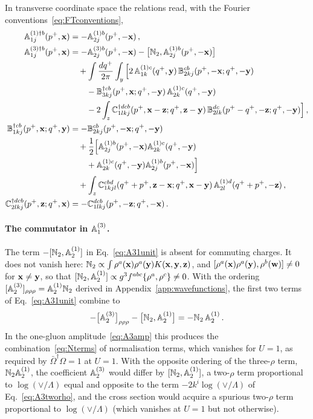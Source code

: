 In transverse coordinate space the relations read, with the Fourier conventions~\eqref{eq:FTconventions},
\begin{align}
\mathbb{A}^{(1)\dagger b}_{1j}(p^+,\mathbf{x})&=-\mathbb{A}^{(1)b}_{2j}(p^+,-\mathbf{x})\,,\notag\\
\mathbb{A}^{(3)\dagger b}_{1j}(p^+,\mathbf{x})&=-\mathbb{A}^{(3)b}_{2j}(p^+,-\mathbf{x})-\big[\mathbb{N}_2,\mathbb{A}^{(1)b}_{2j}(p^+,-\mathbf{x})\big]
\notag\\&\quad+\int\frac{dq^+}{2\pi}\int_y\Big[2\,\mathbb{A}^{(1)c}_{1k}(q^+,\mathbf{y})\,\mathbb{B}^{cb}_{2kj}(p^+,-\mathbf{x};q^+,-\mathbf{y})
\notag\\&\qquad
-\mathbb{B}^{\dagger cb}_{3kj}(p^+,\mathbf{x};q^+,-\mathbf{y})\,\mathbb{A}^{(1)c}_{2k}(q^+,-\mathbf{y})
\notag\\&\qquad-2\int_z\mathbb{C}^{\dagger dcb}_{1lkj}(p^+,\mathbf{x}-\mathbf{z};q^+,\mathbf{z}-\mathbf{y})\,\mathbb{B}^{dc}_{2lk}(p^+-q^+,-\mathbf{z};q^+,-\mathbf{y})\Big]\,,\notag\\
\mathbb{B}^{\dagger cb}_{1kj}(p^+,\mathbf{x};q^+,\mathbf{y})&=-\mathbb{B}^{cb}_{2kj}(p^+,-\mathbf{x};q^+,-\mathbf{y})\notag\\&\quad+\frac12\Big[\mathbb{A}^{(1)b}_{2j}(p^+,-\mathbf{x})\mathbb{A}^{(1)c}_{2k}(q^+,-\mathbf{y})\notag\\&\qquad+\mathbb{A}^{(1)c}_{2k}(q^+,-\mathbf{y})\mathbb{A}^{(1)b}_{2j}(p^+,-\mathbf{x})\Big]
\notag\\&\quad
+\int_z\mathbb{C}^{cbd}_{1kjl}(q^++p^+,\mathbf{z}-\mathbf{x};q^+,\mathbf{x}-\mathbf{y})\,\mathbb{A}^{(1)d}_{2l}(q^++p^+,-\mathbf{z})\,,\notag\\
\mathbb{C}^{\dagger dcb}_{2lkj}(p^+,\mathbf{z};q^+,\mathbf{x})&=-\mathbb{C}^{dcb}_{1lkj}(p^+,-\mathbf{z};q^+,-\mathbf{x})\,.
\end{align}

\paragraph{The commutator in $\mathbb{A}^{(3)}_1$.} The term $-[\mathbb{N}_2,\mathbb{A}^{(1)}_2]$ in Eq.~\eqref{eq:A31unit} is absent for commuting charges. It does not vanish here: $\mathbb{N}_2\propto\int\rho^a(\mathbf{x})\rho^a(\mathbf{y})K(\mathbf{x},\mathbf{y},\mathbf{z})$, and $[\rho^a(\mathbf{x})\rho^a(\mathbf{y}),\rho^b(\mathbf{w})]\neq0$ for $\mathbf{x}\neq\mathbf{y}$, so that $[\mathbb{N}_2,\mathbb{A}^{(1)}_2]\propto g^3f^{abc}\{\rho^a,\rho^c\}\neq0$. With the ordering $[\mathbb{A}^{(3)}_2]_{\rho\rho\rho}=\mathbb{A}^{(1)}_2\mathbb{N}_2$ derived in Appendix~\ref{app:wavefunctions}, the first two terms of Eq.~\eqref{eq:A31unit} combine to
\begin{align}
-\big[\mathbb{A}^{(3)}_2\big]_{\rho\rho\rho}-\big[\mathbb{N}_2,\mathbb{A}^{(1)}_2\big]=-\mathbb{N}_2\,\mathbb{A}^{(1)}_2\,.
\end{align}
In the one-gluon amplitude~\eqref{eq:A3amp} this produces the combination~\eqref{eq:Nterms} of normalisation terms, which vanishes for $U=1$, as required by $\bar\Omega^\dagger\Omega=1$ at $U=1$. With the opposite ordering of the three-$\rho$ term, $\mathbb{N}_2\mathbb{A}^{(1)}_2$, the coefficient $\mathbb{A}^{(3)}_2$ would differ by $[\mathbb{N}_2,\mathbb{A}^{(1)}_2]$, a two-$\rho$ term proportional to $\log(\vee/\Lambda)$ equal and opposite to the term $-2k^i\log(\vee/\Lambda)$ of Eq.~\eqref{eq:A3tworho}, and the cross section would acquire a spurious two-$\rho$ term proportional to $\log(\vee/\Lambda)$ (which vanishes at $U=1$ but not otherwise).
